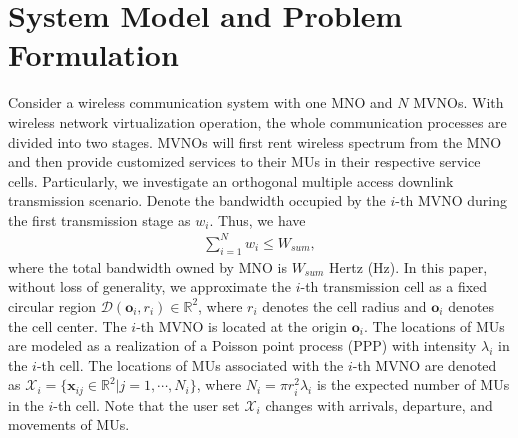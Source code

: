 \documentclass[journal]{IEEEtran}
\begin{document}
\section{System Model and Problem Formulation}
Consider a wireless communication system with one MNO and $N$ MVNOs. With wireless network virtualization operation, the whole communication processes are divided into two stages. MVNOs will first rent wireless spectrum from the MNO and then provide customized services to their MUs in their respective service cells. Particularly, we investigate an orthogonal multiple access downlink transmission scenario. Denote the bandwidth occupied by the $i$-th MVNO during the first transmission stage as $w_i$. Thus, we have
\begin{align}
\sum_{i = 1}^{N} w_i \leq W_{sum},
\end{align}
where the total bandwidth owned by MNO is $W_{sum}$ Hertz (Hz). In this paper, without loss of generality, we approximate the $i$-th transmission cell as a fixed circular region $\mathcal{D}(\mathbf{o}_i, r_i) \in \mathbb{R}^2$, where $r_i$ denotes the cell radius and $\mathbf{o}_i$ denotes the cell center. The $i$-th MVNO is located at the origin $\mathbf{o}_i$. The locations of MUs are modeled as a realization of a Poisson point process (PPP) with intensity $\lambda_i$ in the $i$-th cell. The locations of MUs associated with the $i$-th MVNO are denoted as $\mathcal{X}_i = \{\mathbf{x}_{ij} \in \mathbb{R}^2 | j = 1, \cdots, N_i\}$, where $N_i = \pi r_i^2 \lambda_i$ is the expected number of MUs in the $i$-th cell. Note that the user set $\mathcal{X}_i$ changes with arrivals, departure, and movements of MUs.
\end{document}
